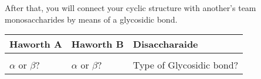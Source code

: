 \documentclass[main.tex]{subfiles}
\begin{document}
After that, you will connect your cyclic structure with another's team monosaccharides by means of a glycosidic bond. 


\begin{center}\resizebox{18cm}{!} {\begin{tabular}{ |p{4cm}|p{4cm}|p{8cm}| }
\hline
Haworth A &  Haworth B    &Disaccharaide   \\
\hline
&&\vspace{1cm}\vspace{1cm}\vspace{1cm}
    \\
\hline
$\alpha$ or $\beta$?\vspace{0.4cm} &  $\alpha$ or $\beta$?\vspace{0.4cm} &  Type of Glycosidic bond?\vspace{0.4cm}  \\
\hline
\end{tabular}}\end{center}






 


\newpage
 
\end{document}
